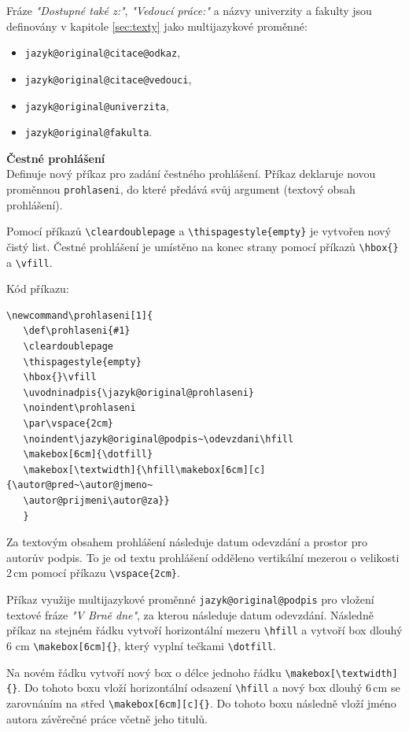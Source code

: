 Fráze \textit{"Dostupné také z:"}, \textit{"Vedoucí práce:"} a názvy univerzity a fakulty jsou definovány v kapitole \ref{sec:texty} jako multijazykové proměnné:

\begin{itemize}[label=-]
	\item \verb|jazyk@original@citace@odkaz|,
	\item \verb|jazyk@original@citace@vedouci|,
	\item \verb|jazyk@original@univerzita|,
	\item \verb|jazyk@original@fakulta|.
\end{itemize}

\vspace{8pt}
\textbf{Čestné prohlášení}\\
Definuje nový příkaz pro zadání čestného prohlášení. Příkaz deklaruje novou proměnnou \verb|prohlaseni|, do které předává svůj argument (textový obsah prohlášení).

Pomocí příkazů \verb|\cleardoublepage| a \verb|\thispagestyle{empty}| je vytvořen nový čistý list. Čestné prohlášení je umístěno na konec strany pomocí příkazů \verb|\hbox{}| a \verb|\vfill|.

Kód příkazu:

\begin{verbatim}
\newcommand\prohlaseni[1]{
   \def\prohlaseni{#1}
   \cleardoublepage
   \thispagestyle{empty}
   \hbox{}\vfill
   \uvodninadpis{\jazyk@original@prohlaseni}
   \noindent\prohlaseni
   \par\vspace{2cm}
   \noindent\jazyk@original@podpis~\odevzdani\hfill
   \makebox[6cm]{\dotfill}
   \makebox[\textwidth]{\hfill\makebox[6cm][c]{\autor@pred~\autor@jmeno~
   \autor@prijmeni\autor@za}}
   }
\end{verbatim}

Za textovým obsahem prohlášení následuje datum odevzdání a prostor pro autorův podpis. To je od textu prohlášení odděleno vertikální mezerou o velikosti 2\,cm pomocí příkazu \verb|\vspace{2cm}|.

Příkaz využije multijazykové proměnné \verb|jazyk@original@podpis| pro vložení textové fráze \textit{"V Brně dne"}, za kterou následuje datum odevzdání. Následně příkaz na stejném řádku vytvoří horizontální mezeru \verb|\hfill| a vytvoří box dlouhý 6 cm \verb|\makebox[6cm]{}|, který vyplní tečkami \verb|\dotfill|.

Na novém řádku vytvoří nový box o délce jednoho řádku \verb|\makebox[\textwidth]{}|. Do tohoto boxu vloží horizontální odsazení \verb|\hfill| a nový box dlouhý 6\,cm se zarovnáním na střed \verb|\makebox[6cm][c]{}|. Do tohoto boxu následně vloží jméno autora závěrečné práce včetně jeho titulů.

